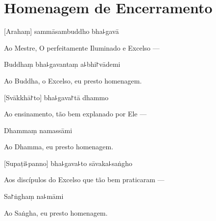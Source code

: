 \clearpage

\chapter{Homenagem de Encerramento}

[Arahaṃ] sammāsambuddho bha꜕gavā

\begin{english}
  Ao Mestre, O perfeitamente Iluminado e Excelso ---
\end{english}

Buddhaṃ bha꜕gavantaṃ a꜕bhi꜓vādemi

\begin{english}
  Ao Buddha, o Excelso, eu presto homenagem.
\end{english}

[Svākkhā꜓to] bha꜕gava꜓tā dhammo

\begin{english}
  Ao ensinamento, tão bem explanado por Ele ---
\end{english}

Dhammaṃ namassāmi

\begin{english}
  Ao Dhamma, eu presto homenagem.
\end{english}


[Supaṭi꜕panno] bha꜕gava꜕to sāvaka꜕saṅgho

\begin{english}
  Aos discípulos do Excelso que tão bem praticaram ---
\end{english}

Sa꜓ṅghaṃ na꜕māmi

\begin{english}
  Ao Saṅgha, eu presto homenagem.
\end{english}

